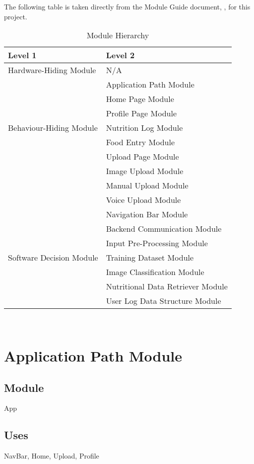 \documentclass[12pt, titlepage]{article}
\begin{document}
The following table is taken directly from the Module Guide document, \cite{MG}, for this project.

\begin{table}[H]
	\centering
	\begin{tabular}{p{} p{}}
		\toprule
		\textbf{Level 1} & \textbf{Level 2}\\
		\midrule
		
		{Hardware-Hiding Module} & N/A \\
		\midrule
		
		\multirow{7}{0.3\textwidth}{Behaviour-Hiding Module} & Application Path Module\\
		& Home Page Module\\
		& Profile Page Module\\
		& Nutrition Log Module\\
		& Food Entry Module \\
		& Upload Page Module\\
		& Image Upload Module\\
		& Manual Upload Module \\
		& Voice Upload Module \\
		& Navigation Bar Module\\
		& Backend Communication Module\\ 
		\midrule
		
		\multirow{3}{0.3\textwidth}{Software Decision Module} & Input Pre-Processing Module\\
		& Training Dataset Module\\
		& Image Classification Module\\
		& Nutritional Data Retriever Module\\
		& User Log Data Structure Module\\
		\bottomrule
		
	\end{tabular}
	\caption{Module Hierarchy}
	\label{TblMH}
\end{table}

~\newpage

\section{Application Path Module} \label{App}
\subsection{Module}
App
\subsection{Uses}
NavBar, Home, Upload, Profile
\end{document}
